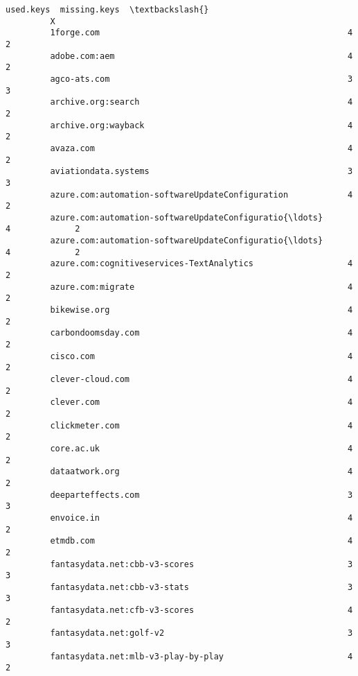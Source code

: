 \documentclass[11pt]{article}
\begin{document}
\begin{Verbatim}[commandchars=\\\{\}]
                                                             used.keys  missing.keys  \textbackslash{}
         X                                                                             
         1forge.com                                                  4             2   
         adobe.com:aem                                               4             2   
         agco-ats.com                                                3             3   
         archive.org:search                                          4             2   
         archive.org:wayback                                         4             2   
         avaza.com                                                   4             2   
         aviationdata.systems                                        3             3   
         azure.com:automation-softwareUpdateConfiguration            4             2   
         azure.com:automation-softwareUpdateConfiguratio{\ldots}          4             2   
         azure.com:automation-softwareUpdateConfiguratio{\ldots}          4             2   
         azure.com:cognitiveservices-TextAnalytics                   4             2   
         azure.com:migrate                                           4             2   
         bikewise.org                                                4             2   
         carbondoomsday.com                                          4             2   
         cisco.com                                                   4             2   
         clever-cloud.com                                            4             2   
         clever.com                                                  4             2   
         clickmeter.com                                              4             2   
         core.ac.uk                                                  4             2   
         dataatwork.org                                              4             2   
         deeparteffects.com                                          3             3   
         envoice.in                                                  4             2   
         etmdb.com                                                   4             2   
         fantasydata.net:cbb-v3-scores                               3             3   
         fantasydata.net:cbb-v3-stats                                3             3   
         fantasydata.net:cfb-v3-scores                               4             2   
         fantasydata.net:golf-v2                                     3             3   
         fantasydata.net:mlb-v3-play-by-play                         4             2   

\end{Verbatim}
\end{document}
